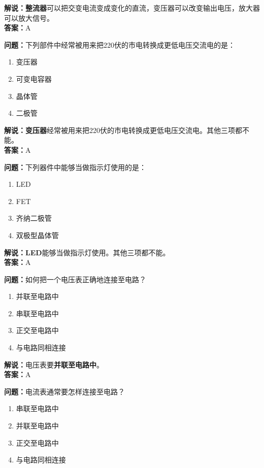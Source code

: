 \textbf{解说：整流器}可以把交变电流变成变化的直流，变压器可以改变输出电压，放大器可以放大信号。\\\textbf{答案：}A%



\textbf{问题：}下列部件中经常被用来把220伏的市电转换成更低电压交流电的是：

\begin{enumerate}[label=\Alph*), leftmargin=1.5cm]
	\item 变压器
	\item 可变电容器
	\item 晶体管
	\item 二极管
\end{enumerate}

\textbf{解说：变压器}经常被用来把220伏的市电转换成更低电压交流电。其他三项都不能。\\\textbf{答案：}A%

\textbf{问题：}下列器件中能够当做指示灯使用的是：

\begin{enumerate}[label=\Alph*), leftmargin=1.5cm]
	\item LED
	\item FET
	\item 齐纳二极管
	\item 双极型晶体管
\end{enumerate}

\textbf{解说：LED}能够当做指示灯使用。其他三项都不能。\\\textbf{答案：}A%

\textbf{问题：}如何把一个电压表正确地连接至电路？

\begin{enumerate}[label=\Alph*), leftmargin=1.5cm]
	\item 并联至电路中
	\item 串联至电路中
	\item 正交至电路中
	\item 与电路同相连接
\end{enumerate}

\textbf{解说：}电压表要\textbf{并联至电路中}。\\\textbf{答案：}A%


\textbf{问题：}电流表通常要怎样连接至电路？

\begin{enumerate}[label=\Alph*), leftmargin=1.5cm]
	\item 串联至电路中
	\item 并联至电路中
	\item 正交至电路中
	\item 与电路同相连接
\end{enumerate}

